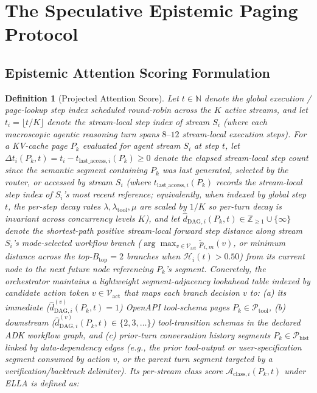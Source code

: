 \documentclass[conference,10pt]{IEEEtran}
\newtheorem{definition}{Definition}
\begin{document}
\section{The Speculative Epistemic Paging Protocol}

\subsection{Epistemic Attention Scoring Formulation}
\begin{definition}[Projected Attention Score]
Let $t \in \mathbb{N}$ denote the global execution / page-lookup step index scheduled round-robin across the $K$ active streams, and let $t_i = \lfloor t/K \rfloor$ denote the stream-local step index of stream $S_i$ (where each macroscopic agentic reasoning turn spans $8\text{--}12$ stream-local execution steps). For a KV-cache page $P_k$ evaluated for agent stream $S_i$ at step $t$, let $\Delta t_i(P_k, t) = t_i - t_{\text{last\_access},i}(P_k) \ge 0$ denote the elapsed stream-local step count since the semantic segment containing $P_k$ was last generated, selected by the router, or accessed by stream $S_i$ (where $t_{\text{last\_access},i}(P_k)$ records the stream-local step index of $S_i$'s most recent reference; equivalently, when indexed by global step $t$, the per-step decay rates $\lambda, \lambda_{\text{tool}}, \mu$ are scaled by $1/K$ so per-turn decay is invariant across concurrency levels $K$), and let $\hat{d}_{\text{DAG},i}(P_k, t) \in \mathbb{Z}_{\ge 1} \cup \{\infty\}$ denote the shortest-path positive stream-local forward step distance along stream $S_i$'s mode-selected workflow branch ($\arg\max_{v \in \mathcal{V}_{\text{act}}} \tilde{p}_{i,m}(v)$, or minimum distance across the top-$B_{\text{top}}=2$ branches when $\mathcal{H}_i(t) > 0.50$) from its current node to the next future node referencing $P_k$'s segment. Concretely, the orchestrator maintains a lightweight \textit{segment-adjacency lookahead table} indexed by candidate action token $v \in \mathcal{V}_{\text{act}}$ that maps each branch decision $v$ to: (a) its immediate ($\hat{d}_{\text{DAG},i}^{(v)}(P_k, t) = 1$) OpenAPI tool-schema pages $P_k \in \mathcal{P}_{\text{tool}}$, (b) downstream ($\hat{d}_{\text{DAG},i}^{(v)}(P_k, t) \in \{2, 3, \dots\}$) tool-transition schemas in the declared ADK workflow graph, and (c) prior-turn conversation history segments $P_k \in \mathcal{P}_{\text{hist}}$ linked by data-dependency edges (e.g., the prior tool-output or user-specification segment consumed by action $v$, or the parent turn segment targeted by a verification/backtrack delimiter). Its per-stream class score $\mathcal{A}_{\text{class},i}(P_k, t)$ under ELLA is defined as:

\end{definition}
\end{document}
